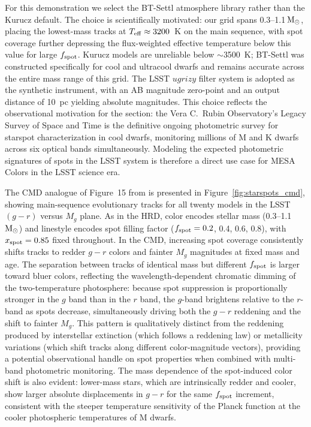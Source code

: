 \documentclass[linenumbers,apj,twocolumn, floatfix]{aastex701} \usepackage{amsmath} \usepackage{longtable} \usepackage{graphicx} \usepackage{ulem} \usepackage{xcolor} \usepackage{lettrine} \usepackage{yfonts} \usepackage{rotating}
\begin{document}
For this demonstration we select the BT-Settl atmosphere library \citep{Allard2012} rather than the Kurucz default.
The choice is scientifically motivated: our grid spans 0.3--1.1\,$\rm M_\odot$, placing the lowest-mass tracks at $T_{\rm eff} \approx 3200$~K on the main sequence, with spot coverage further depressing the flux-weighted effective temperature below this value for large $f_{\rm spot}$.
Kurucz models are unreliable below $\sim$3500~K; BT-Settl was constructed specifically for cool and ultracool dwarfs and remains accurate across the entire mass range of this grid.
The LSST $ugrizy$ filter system is adopted as the synthetic instrument, with an AB magnitude zero-point and an output distance of 10~pc yielding absolute magnitudes.
This choice reflects the observational motivation for the section: the Vera C.\ Rubin Observatory's Legacy Survey of Space and Time \citep{LSST} is the definitive ongoing photometric survey for starspot characterization in cool dwarfs, monitoring millions of M and K dwarfs across six optical bands simultaneously.
Modeling the expected photometric signatures of spots in the LSST system is therefore a direct use case for MESA Colors in the LSST science era.

The CMD analogue of Figure~15 from \citet{Jermyn2023} is presented in Figure~\ref{fig:starspots_cmd}, showing main-sequence evolutionary tracks for all twenty models in the LSST $(g-r)$ versus $M_g$ plane.
As in the HRD, color encodes stellar mass (0.3--1.1\,$\rm M_\odot$) and linestyle encodes spot filling factor ($f_{\rm spot} = 0.2$, 0.4, 0.6, 0.8), with $x_{\rm spot} = 0.85$ fixed throughout.
In the CMD, increasing spot coverage consistently shifts tracks to redder $g-r$ colors and fainter $M_g$ magnitudes at fixed mass and age.
The separation between tracks of identical mass but different $f_{\rm spot}$ is larger toward bluer colors, reflecting the wavelength-dependent chromatic dimming of the two-temperature photosphere: because spot suppression is proportionally stronger in the $g$ band than in the $r$ band, the $g$-band brightens relative to the $r$-band as spots decrease, simultaneously driving both the $g-r$ reddening and the shift to fainter $M_g$.
This pattern is qualitatively distinct from the reddening produced by interstellar extinction (which follows a reddening law) or metallicity variations (which shift tracks along different color-magnitude vectors), providing a potential observational handle on spot properties when combined with multi-band photometric monitoring.
The mass dependence of the spot-induced color shift is also evident: lower-mass stars, which are intrinsically redder and cooler, show larger absolute displacements in $g-r$ for the same $f_{\rm spot}$ increment, consistent with the steeper temperature sensitivity of the Planck function at the cooler photospheric temperatures of M dwarfs.
\end{document}
